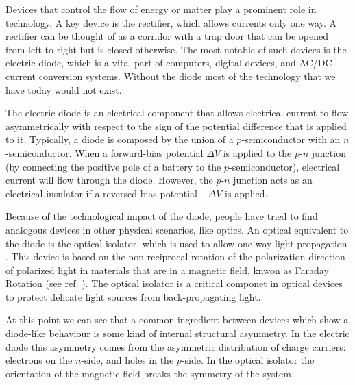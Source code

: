 
\label{Introduction}

Devices that control the flow of energy or matter play a prominent role in technology. A key device is the rectifier, which allows currents only one way. A rectifier can be thought of as a corridor with a trap door that can be opened from left to right but is closed otherwise. The most notable of such devices is the electric diode, which is a vital part of computers, digital devices, and AC/DC current conversion systems. Without the diode most of the technology that we have today would not exist.

The electric diode is an electrical component that allows electrical current to flow asymmetrically with respect to the sign of the potential difference that is applied to it. Typically, a diode is composed by the union of a $p$-semiconductor with an $n$-semiconductor. When a forward-bias potential $\Delta V$ is applied to the $p$-$n$ junction (by connecting the positive pole of a battery to the $p$-semiconductor), electrical current will flow through the diode. However, the $p$-$n$ junction acts as an electrical insulator if a reversed-bias potential $-\Delta V$ is applied.

Because of the technological impact of the diode, people have tried to find analogous devices in other physical scenarios, like optics. An optical equivalent to the diode is the optical isolator, which is used to allow one-way light propagation \cite{Saleh1991}. This device is based on the non-reciprocal rotation of the polarization direction of polarized light in materials that are in a magnetic field, knwon as Faraday Rotation (see ref. \cite{Yariv1984}). The optical isolator is a critical componet in optical devices to protect delicate light sources from back-propagating light.

At this point we can see that a common ingredient between devices which show a diode-like behaviour is some kind of internal structural asymmetry. In the electric diode this asymmetry comes from the asymmetric distribution of charge carriers: electrons on the $n$-side, and holes in the $p$-side. In the optical isolator the orientation of the magnetic field breaks the symmetry of the system.

